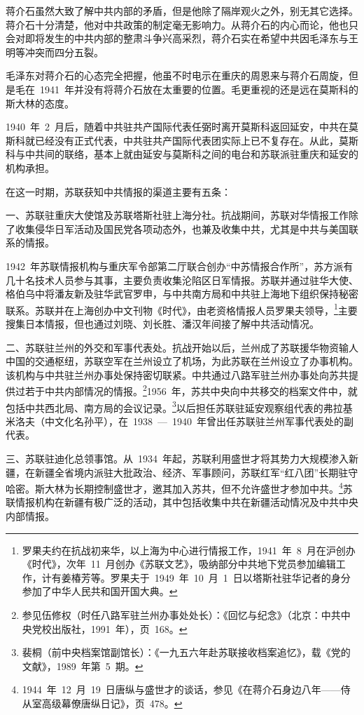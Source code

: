 蒋介石虽然大致了解中共内部的矛盾，但是他除了隔岸观火之外，别无其它选择。蒋介石十分清楚，他对中共政策的制定毫无影响力。从蒋介石的内心而论，他也只会对即将发生的中共内部的整肃斗争兴高采烈，蒋介石实在希望中共因毛泽东与王明等冲突而四分五裂。

毛泽东对蒋介石的心态完全把握，他虽不时电示在重庆的周恩来与蒋介石周旋，但是毛在~1941~年并没有将蒋介石放在太重要的位置。毛更重视的还是远在莫斯科的斯大林的态度。

1940~年~2~月后，随着中共驻共产国际代表任弼时离开莫斯科返回延安，中共在莫斯科就已经没有正式代表，中共驻共产国际代表团实际上已不复存在。从此，莫斯科与中共间的联络，基本上就由延安与莫斯科之间的电台和苏联派驻重庆和延安的机构承担。

在这一时期，苏联获知中共情报的渠道主要有五条：

一、苏联驻重庆大使馆及苏联塔斯社驻上海分社。抗战期间，苏联对华情报工作除了收集侵华日军活动及国民党各项动态外，也兼及收集中共，尤其是中共与美国联系的情报。

1942~年苏联情报机构与重庆军令部第二厅联合创办“中苏情报合作所”，苏方派有几十名技术人员参与其事，主要负责收集沦陷区日军情报。苏联并通过驻华大使、格伯乌中将潘友新及驻华武官罗申，与中共南方局和中共驻上海地下组织保持秘密联系。苏联并在上海创办中文刊物《时代》，由老资格情报人员罗果夫领导，\footnote{罗果夫约在抗战初来华，以上海为中心进行情报工作，1941~年~8~月在沪创办《时代》，次年~11~月创办《苏联文艺》，吸纳部分中共地下党员参加编辑工作，计有姜椿芳等。罗果夫于~1949~年~10~月~1~日以塔斯社驻华记者的身分参加了中华人民共和国开国大典。}主要搜集日本情报，但也通过刘晓、刘长胜、潘汉年间接了解中共活动情况。

二、苏联驻兰州的外交和军事代表处。抗战开始以后，兰州成了苏联援华物资输人中国的交通枢纽，苏联空军在兰州设立了机场，为此苏联在兰州设立了办事机构。该机构与中共驻兰州办事处保持密切联紧。中共通过八路军驻兰州办事处向苏共提供过若于中共内部情况的情报。\footnote{参见伍修权（时任八路军驻兰州办事处处长）：《回忆与纪念》（北京：中共中央党校出版社，1991~年），页~168。}1956~年，苏共中央向中共移交的档案文件中，就包括中共西北局、南方局的会议记录。\footnote{裴桐（前中央档案馆副馆长）：《一九五六年赴苏联接收档案追忆》，载《党的文献》，1989~年第~5~期。}以后担任苏联驻延安观察组代表的弗拉基米洛夫（中文化名孙平），在~1938~—~1940~年曾出任苏联驻兰州军事代表处的副代表。

三、苏联驻迪化总领事馆。从~1934~年起，苏联利用盛世才将其势力大规模渗入新疆，在新疆全省境内派驻大批政治、经济、军事顾问，苏联红军“红八团”长期驻守哈密。斯大林为长期控制盛世才，邀其加入苏共，但不允许盛世才参加中共。\footnote{1944~年~12~月~19~日唐纵与盛世才的谈话，参见《在蒋介石身边八年——侍从室高级幕僚唐纵日记》，页~478。}苏联情报机构在新疆有极广泛的活动，其中包括收集中共在新疆活动情况及中共中央内部情报。


